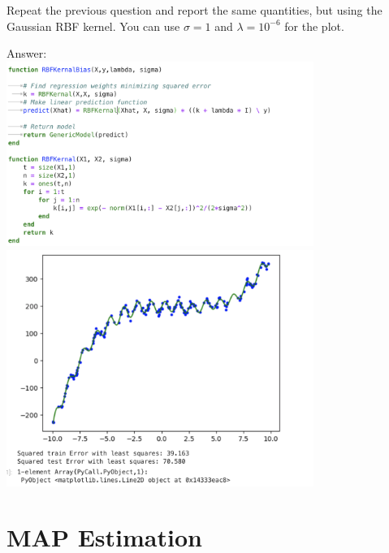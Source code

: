 \documentclass{article}
\def\ans#1{\par\gre{Answer: #1}}
\def\blu#1{{\color{blu}#1}}
\def\gre#1{{\color{gre}#1}}
\begin{document}
\blu{Repeat the previous question and report the same quantities, but using the Gaussian RBF kernel.} You can use $\sigma=1$ and $\lambda=10^{-6}$ for the plot.
\ans{
    \\\includegraphics[width=10cm]{Q14.png}\\
    \includegraphics[width=10cm]{Q15.png}
    }


\section{MAP Estimation}
\end{document}

